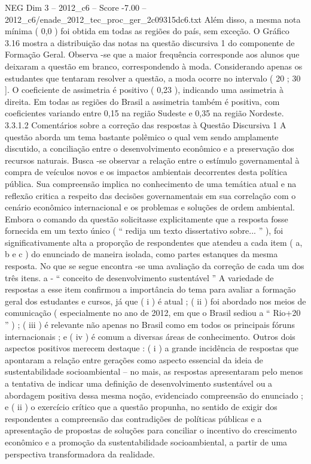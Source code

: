 \begin{textsample}{NEG Dim 3 – 2012\_c6 – Score -7.00 – 2012\_c6/enade\_2012\_tec\_proc\_ger\_2c09315dc6.txt}
Além disso, a mesma nota mínima ( 0,0 ) foi obtida em todas as regiões do país, sem exceção.
O Gráfico 3.16 mostra a distribuição das notas na questão discursiva 1 do componente de Formação Geral.
Observa -se que a maior frequência corresponde aos alunos que deixaram a questão em branco, correspondendo à moda.
Considerando apenas os estudantes que tentaram resolver a questão, a moda ocorre no intervalo ( 20 ; 30 ].
O coeficiente de assimetria é positivo ( 0,23 ), indicando uma assimetria à direita.
Em todas as regiões do Brasil a assimetria também é positiva, com coeficientes variando entre 0,15 na região Sudeste e 0,35 na região Nordeste. 3.3.1.2 Comentários sobre a correção das respostas à Questão Discursiva 1 A questão aborda um tema bastante polêmico o qual vem sendo amplamente discutido, a conciliação entre o desenvolvimento econômico e a preservação dos recursos naturais.
Busca -se observar a relação entre o estímulo governamental à compra de veículos novos e os impactos ambientais decorrentes desta política pública.
Sua compreensão implica no conhecimento de uma temática atual e na reflexão critica a respeito das decisões governamentais em sua correlação com o cenário econômico internacional e os problemas e soluções de ordem ambiental.
Embora o comando da questão solicitasse explicitamente que a resposta fosse fornecida em um texto único ( “ redija um texto dissertativo sobre... ” ), foi significativamente alta a proporção de respondentes que atendeu a cada item ( a, b e c ) do enunciado de maneira isolada, como partes estanques da mesma resposta.
No que se segue encontra -se uma avaliação da correção de cada um dos três itens. a - “ conceito de desenvolvimento sustentável ” A variedade de respostas a esse item confirmou a importância do tema para avaliar a formação geral dos estudantes e cursos, já que ( i ) é atual ; ( ii ) foi abordado nos meios de comunicação ( especialmente no ano de 2012, em que o Brasil sediou a “ Rio+20 ” ) ; ( iii ) é relevante não apenas no Brasil como em todos os principais fóruns internacionais ; e ( iv ) é comum a diversas áreas de conhecimento.
Outros dois aspectos positivos merecem destaque : ( i ) a grande incidência de respostas que apontaram a relação entre gerações como aspecto essencial da ideia de sustentabilidade socioambiental – no mais, as respostas apresentaram pelo menos a tentativa de indicar uma definição de desenvolvimento sustentável ou a abordagem positiva dessa mesma noção, evidenciado compreensão do enunciado ; e ( ii ) o exercício crítico que a questão propunha, no sentido de exigir dos respondentes a compreensão das contradições de políticas públicas e a apresentação de propostas de soluções para conciliar o incentivo do crescimento econômico e a promoção da sustentabilidade socioambiental, a partir de uma perspectiva transformadora da realidade.

\end{textsample}
